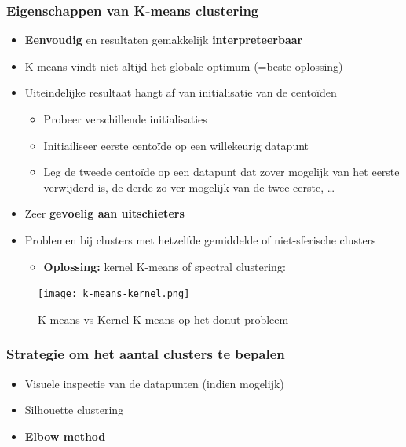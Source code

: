 \documentclass{article}
\begin{document}
\subsubsection{Eigenschappen van K-means clustering}

\begin{itemize}
    \item \textbf{Eenvoudig} en resultaten gemakkelijk \textbf{interpreteerbaar}
    \item K-means vindt niet altijd het globale optimum (=beste oplossing)
    \item Uiteindelijke resultaat hangt af van initialisatie van de centoïden
    \begin{itemize}
        \item Probeer verschillende initialisaties
        \item Initiailiseer eerste centoïde op een willekeurig datapunt
        \item Leg de tweede centoïde op een datapunt dat zover mogelijk van het eerste verwijderd is, de derde zo ver mogelijk van de twee eerste, \dots
    \end{itemize}
    \item Zeer \textbf{gevoelig aan uitschieters}
    \item Problemen bij clusters met hetzelfde gemiddelde of niet-sferische clusters
    \begin{itemize}
        \item \textbf{Oplossing:} kernel K-means of spectral clustering:
    \end{itemize}
\end{itemize}

\begin{figure}[H]
    \centering
    \texttt{[image: k-means-kernel.png]}
    \caption{K-means vs Kernel K-means op het donut-probleem}
\end{figure}

\subsubsection{Strategie om het aantal clusters te bepalen}

\begin{itemize}
    \item Visuele inspectie van de datapunten (indien mogelijk)
    \item Silhouette clustering
    \item \textbf{Elbow method}
\end{itemize}
\end{document}
